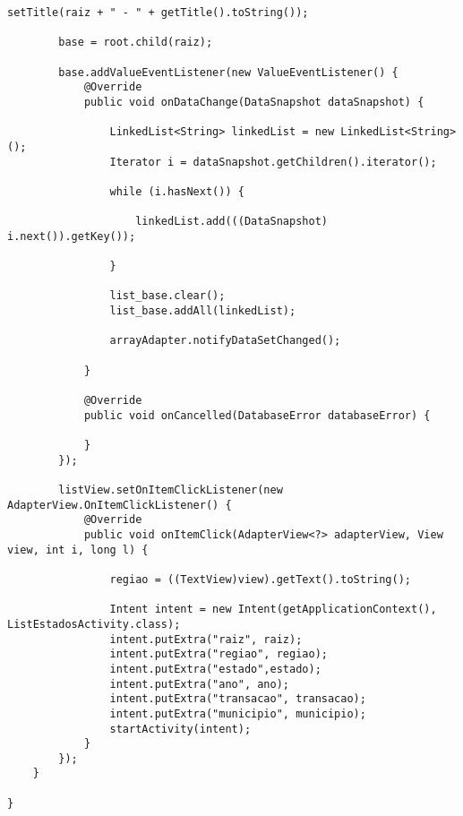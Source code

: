 \documentclass[12pt,a4paper]{article}
\begin{document}
\begin{lstlisting}[caption=./mobile/src/main/java/app/transparenciaeducativa/MapaBrasilActivity.java]
        setTitle(raiz + " - " + getTitle().toString());

        base = root.child(raiz);

        base.addValueEventListener(new ValueEventListener() {
            @Override
            public void onDataChange(DataSnapshot dataSnapshot) {

                LinkedList<String> linkedList = new LinkedList<String>();
                Iterator i = dataSnapshot.getChildren().iterator();

                while (i.hasNext()) {

                    linkedList.add(((DataSnapshot) i.next()).getKey());

                }

                list_base.clear();
                list_base.addAll(linkedList);

                arrayAdapter.notifyDataSetChanged();

            }

            @Override
            public void onCancelled(DatabaseError databaseError) {

            }
        });

        listView.setOnItemClickListener(new AdapterView.OnItemClickListener() {
            @Override
            public void onItemClick(AdapterView<?> adapterView, View view, int i, long l) {

                regiao = ((TextView)view).getText().toString();

                Intent intent = new Intent(getApplicationContext(), ListEstadosActivity.class);
                intent.putExtra("raiz", raiz);
                intent.putExtra("regiao", regiao);
                intent.putExtra("estado",estado);
                intent.putExtra("ano", ano);
                intent.putExtra("transacao", transacao);
                intent.putExtra("municipio", municipio);
                startActivity(intent);
            }
        });
    }

}
\end{lstlisting}
\pagebreak
\end{document}
